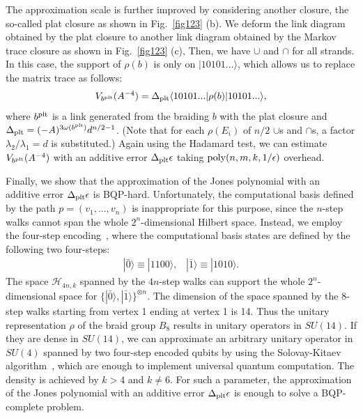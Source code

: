 The approximation scale is further improved 
by considering another closure, the so-called plat closure
as shown in Fig.~\ref{fig123} (b).
We deform the link diagram obtained by the plat closure
to another link diagram obtained 
by the Markov trace closure as shown in Fig.~\ref{fig123} (c),
Then, we have $\cup$ and $\cap$ for all strands.
In this case, the support of $\rho (b)$ 
is only on $|10101...\rangle$,
which allows us to replace the matrix trace 
as follows:
\begin{eqnarray}
V_{b^{\rm plt}}(A^{-4}) = \Delta_{\rm plt} 
\langle 10101...| \rho (b) | 10101...\rangle,
\end{eqnarray}
where $b^{\rm plt}$ is a link generated from 
the braiding $b$ with the plat closure
and $\Delta _{\rm plt} = (-A)^{3 \omega (b^{\rm plt})}d^{n/2-1}$.
(Note that for each $\rho(E_i)$ of $n/2$ $\cup$s and $\cap$s, 
a factor ${\lambda_{2}/\lambda_{1}} = d$ is substituted.)
Again using the Hadamard test,
we can estimate $V_{b^{\rm plt}}(A^{-4})$ 
with an additive error $\Delta _{\rm plt} \epsilon$
taking ${\rm poly}(n,m,k,1/\epsilon)$ overhead.

Finally, we show that the approximation of the Jones polynomial 
with an additive error $\Delta _{\rm plt} \epsilon$ is BQP-hard.
Unfortunately, the computational basis defined by the path $p=(v_1,...,v_n)$
is inappropriate for this purpose,
since the $n$-step walks cannot span the whole $2^n$-dimensional Hilbert space.
Instead, we employ the four-step encoding~\cite{wocjan06}, 
where the computational basis states are defined by the following 
two four-steps:  
\begin{eqnarray}
|\bar 0 \rangle \equiv |1100\rangle, \;\;\; |\bar 1 \rangle 
\equiv |1010\rangle.
\end{eqnarray}
The space $\mathcal{H}_{4n,k}$ spanned by the $4n$-step walks
can support the whole $2^n$-dimensional space for $\{ |\bar 0 \rangle , |\bar 1\rangle \}^{\otimes n}$.
The dimension of the space spanned by the 8-step walks
starting from vertex 1 ending at vertex 1
is 14. Thus the unitary representation $\rho$ 
of the braid group $B_8$
results in unitary operators in $SU(14)$.
If they are dense in $SU(14)$,
we can approximate an arbitrary unitary operator in $SU(4)$ spanned by two four-step encoded qubits
by using the Solovay-Kitaev algorithm~\cite{AharonovJonesHard},
which are enough to implement universal quantum computation.
The density is achieved by $k>4$ and $k\neq 6$.
For such a parameter, 
the approximation of the Jones polynomial with an additive 
error $\Delta _{\rm plt} \epsilon$ is enough to solve 
a BQP-complete problem.

